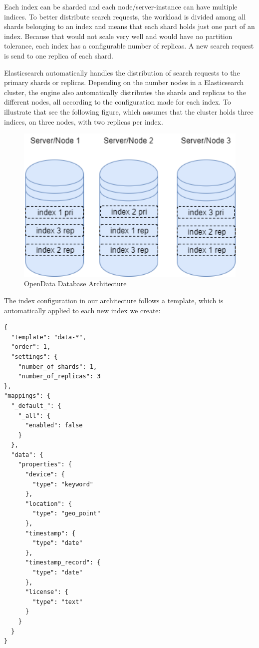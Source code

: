 Each index can be sharded and each node/server-instance can have
multiple indices. To better distribute search requests, the workload is
divided among all shards belonging to an index and means that each shard
holds just one part of an index. Because that would not scale very well
and would have no partition tolerance, each index has a configurable
number of replicas. A new search request is send to one replica of each
shard.

Elasticsearch automatically handles the distribution of search requests
to the primary shards or replicas. Depending on the number nodes in a
Elasticsearch cluster, the engine also automatically distributes the
shards and replicas to the different nodes, all according to the
configuration made for each index. To illustrate that see the following
figure, which assumes that the cluster holds three indices, on three
nodes, with two replicas per index.

\begin{figure}[htbp]
	\centering
	\includegraphics[width=1.00\textwidth]{images/07_database_architecture_elastic.png}
	\caption{OpenData Database Architecture}
	\label{fig:elastic-architecture}
\end{figure}

The index configuration in our architecture follows a template, which is
automatically applied to each new index we create:

\begin{verbatim}
{
  "template": "data-*",
  "order": 1,
  "settings": {
    "number_of_shards": 1,
    "number_of_replicas": 3
},
"mappings": {
  "_default_": {
    "_all": {
      "enabled": false
    }
  },
  "data": {
    "properties": {
      "device": {
        "type": "keyword"
      },
      "location": {
        "type": "geo_point"
      },
      "timestamp": {
        "type": "date"
      },
      "timestamp_record": {
        "type": "date"
      },
      "license": {
        "type": "text"
      }
    }
  }
}
\end{verbatim}

